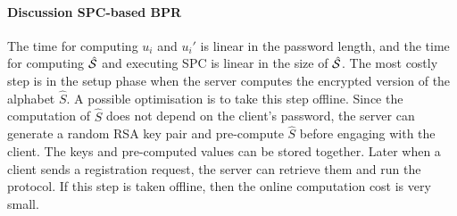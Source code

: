 

\paragraph{Discussion SPC-based BPR}
The time for computing $u_i$ and $u_i'$ is linear in the password length, and the time for computing $\hat{\mathcal{S}}$ and executing \ac{SPC} is linear in the size of $\hat{\mathcal{S}}$. 
The most costly step is in the setup phase when the server computes the encrypted version of the alphabet $\hat{S}$.
A possible optimisation is to take this step offline. 
Since the computation of $\hat{S}$ does not depend on the client's password, the server can generate a random RSA key pair and pre-compute $\hat{S}$ before engaging with the client. 
The keys and pre-computed values can be stored together. 
Later when a client sends a registration request, the server can retrieve them and run the protocol. 
If this step is taken offline, then the online computation cost is very small.

